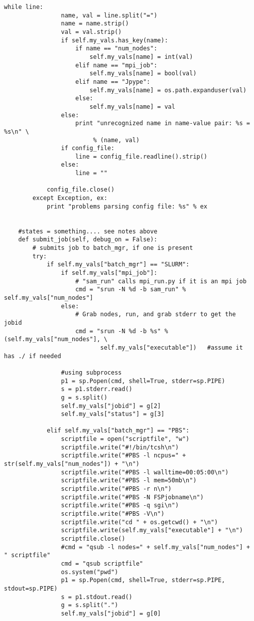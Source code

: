 \begin{lstlisting}[frame=single,
    caption={batch\_mgmt\_script.py}, label=batchscript]
            while line:
                name, val = line.split("=")
                name = name.strip()
                val = val.strip()
                if self.my_vals.has_key(name):
                    if name == "num_nodes":
                        self.my_vals[name] = int(val)
                    elif name == "mpi_job":
                        self.my_vals[name] = bool(val)
                    elif name == "Jpype":
                        self.my_vals[name] = os.path.expanduser(val)
                    else:
                        self.my_vals[name] = val
                else:
                    print "unrecognized name in name-value pair: %s = %s\n" \
                         % (name, val)
                if config_file:
                    line = config_file.readline().strip()
                else:
                    line = ""
                        
            config_file.close()
        except Exception, ex:
            print "problems parsing config file: %s" % ex
                               
                
    #states = something.... see notes above
    def submit_job(self, debug_on = False):
        # submits job to batch_mgr, if one is present
        try:
            if self.my_vals["batch_mgr"] == "SLURM":
                if self.my_vals["mpi_job"]:
                    # "sam_run" calls mpi_run.py if it is an mpi job 
                    cmd = "srun -N %d -b sam_run" % self.my_vals["num_nodes"]
                else:
                    # Grab nodes, run, and grab stderr to get the jobid
                    cmd = "srun -N %d -b %s" % (self.my_vals["num_nodes"], \
                           self.my_vals["executable"])   #assume it has ./ if needed

                #using subprocess
                p1 = sp.Popen(cmd, shell=True, stderr=sp.PIPE)
                s = p1.stderr.read()
                g = s.split()
                self.my_vals["jobid"] = g[2]
                self.my_vals["status"] = g[3]
                
            elif self.my_vals["batch_mgr"] == "PBS":
                scriptfile = open("scriptfile", "w")
                scriptfile.write("#!/bin/tcsh\n")
                scriptfile.write("#PBS -l ncpus=" + str(self.my_vals["num_nodes"]) + "\n")
                scriptfile.write("#PBS -l walltime=00:05:00\n")
                scriptfile.write("#PBS -l mem=50mb\n")
                scriptfile.write("#PBS -r n\n")
                scriptfile.write("#PBS -N FSPjobname\n")
                scriptfile.write("#PBS -q sgi\n")
                scriptfile.write("#PBS -V\n")
                scriptfile.write("cd " + os.getcwd() + "\n")
                scriptfile.write(self.my_vals["executable"] + "\n")
                scriptfile.close()
                #cmd = "qsub -l nodes=" + self.my_vals["num_nodes"] + " scriptfile"
                cmd = "qsub scriptfile"
                os.system("pwd")
                p1 = sp.Popen(cmd, shell=True, stderr=sp.PIPE, stdout=sp.PIPE)
                s = p1.stdout.read()
                g = s.split(".")
                self.my_vals["jobid"] = g[0]


\end{lstlisting}
